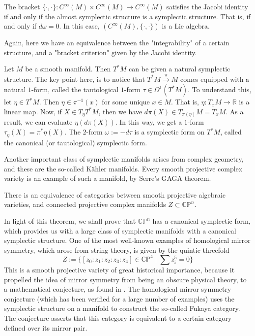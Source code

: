 \begin{theorem}
  The bracket $\{\cdot,\cdot\}:C^\infty(M)\times C^\infty(M)\to C^\infty(M)$ satisfies the Jacobi identity if and only if the almost symplectic structure is a symplectic structure. That is, if and only if $d\omega=0$. In this case, $(C^\infty(M),\{\cdot,\cdot\})$ is a Lie algebra.
\end{theorem}
Again, here we have an equivalence between the "integrability" of a certain structure, and a "bracket criterion" given by the Jacobi identity. 
\begin{example}
  Let $M$ be a smooth manifold. Then $T^*M$ can be given a natural symplectic structure. The key point here, is to notice that $T^*M\xrightarrow{\pi}M$ comes equipped with a natural $1$-form, called the tautological $1$-form $\tau\in\Omega^1(T^*M)$. To understand this, let $\eta\in T^*M$. Then $\eta\in \pi^{-1}(x)$ for some unique $x\in M$. That is, $\eta:T_xM\to \mathbb{R}$ is a linear map. Now, if $X\in T_\eta T^*M$, then we have $d\pi(X)\in T_{\pi(\eta)}M=T_xM$. As a result, we can evaluate $\eta(d\pi(X))$. In this way, we get a $1$-form $\tau_\eta(X)=\pi^*\eta(X)$. The $2$-form $\omega:=-d\tau$ is a symplectic form on $T^*M$, called the canonical (or tautological) symplectic form.
\end{example}
Another important class of symplectic manifolds arises from complex geometry, and these are the so-called Kähler manifolds. Every smooth projective complex variety is an example of such a manifold, by Serre's GAGA theorem.
\begin{theorem}
  There is an equivalence of categories between smooth projective algebraic varieties, and connected projective complex manifolds $Z\subset\mathbb{CP}^n$.
\end{theorem}
In light of this theorem, we shall prove that $\mathbb{CP}^n$ has a canonical symplectic form, which provides us with a large class of symplectic manifolds with a canonical symplectic structure. One of the most well-known examples of homological mirror symmetry, which arose from string theory, is given by the quintic threefold
$$Z:=\{[z_0:z_1:z_2:z_3:z_4]\in\mathbb{CP}^4\mid \sum z_i^5=0\}$$
This is a smooth projective variety of great historical importance, because it propelled the idea of mirror symmetry from being an obscure physical theory, to a mathematical conjecture, as found in \cite{Kontsevich1994Homological}.
The homological mirror symmetry conjecture (which has been verified for a large number of examples) uses the symplectic structure on a manifold to construct the so-called Fukaya category. The conjecture asserts that this category is equivalent to a certain category defined over its mirror pair.\\

